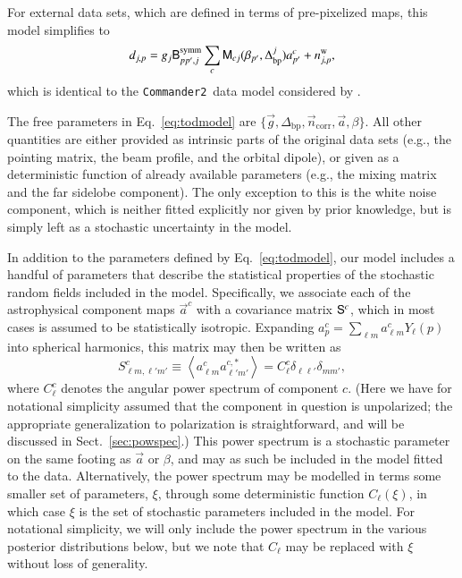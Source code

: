 \documentclass[twocolumn]{aa}
\def\commandertwo{\texttt{Commander2}}
\newcommand{\n}[0]{\vec{n}}
\renewcommand{\a}[0]{\vec{a}}
\newcommand{\B}[0]{\tens{B}}
\newcommand{\g}[0]{\vec{g}}
\newcommand{\M}[0]{\tens{M}}
\renewcommand{\S}[0]{\tens{S}}
\newcommand{\Dbp}[0]{\Delta_{\mathrm{bp}}}
\begin{document}
For external data sets, which are defined in terms of pre-pixelized
maps, this model simplifies to
\begin{equation}
  d_{j,p} = g_{j}\B^{\mathrm{symm}}_{pp',j}\sum_{c} \M_{cj}(\beta_{p'},
  \Dbp^{j})a^c_{p'} + n^{\mathrm{w}}_{j,p},
  \label{eq:pixmodel}
\end{equation}
which is identical to the \commandertwo\ data model considered by
\citet{seljebotn:2019}.

The free parameters in Eq.~\eqref{eq:todmodel} are
$\{\g,\Dbp,\n_{\mathrm{corr}}, \a, \beta\}$. All other
quantities are either provided as intrinsic parts of the original data
sets (e.g., the pointing matrix, the beam profile, and the orbital
dipole), or given as a deterministic function of already available
parameters (e.g., the mixing matrix and the far sidelobe
component). The only exception to this is the white noise component,
which is neither fitted explicitly nor given by prior knowledge, but
is simply left as a stochastic uncertainty in the model.

In addition to the parameters defined by Eq.~\eqref{eq:todmodel}, our
model includes a handful of parameters that describe the statistical
properties of the stochastic random fields included in the
model. Specifically, we associate each of the astrophysical component
maps $\a^c$ with a covariance matrix $\S^c$, which in most cases is
assumed to be statistically isotropic. Expanding $a^c_p = \sum_{\ell
  m} a^{c}_{\ell m} Y_{\ell}(p)$ into spherical harmonics, this matrix may
then be written as
\begin{equation}
S^{c}_{\ell m, \ell' m'} \equiv \left< a^{c}_{\ell m} a^{c,*}_{\ell' m'}\right> = C^{c}_{\ell} \delta_{\ell\ell'} \delta_{mm'},
\end{equation}
where $C^{c}_{\ell}$ denotes the angular power spectrum of component
$c$. (Here we have for notational simplicity assumed that the
component in question is unpolarized; the appropriate generalization
to polarization is straightforward, and will be discussed in Sect.~\ref{sec:powspec}.)
This power spectrum is a stochastic parameter on the same footing as
$\a$ or $\beta$, and may as such be included in the model fitted to
the data. Alternatively, the power spectrum may be modelled in terms
some smaller set of parameters, $\xi$, through some deterministic
function $C_{\ell}(\xi)$, in which case $\xi$ is the set of
stochastic parameters included in the model. For notational
simplicity, we will only include the power spectrum in the various
posterior distributions below, but we note that $C_\ell$ may be
replaced with $\xi$ without loss of generality.
\end{document}
